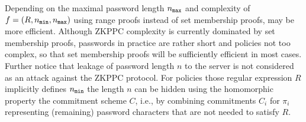 \begin{remark}\label{rangeproofs}
Depending on the maximal password length ${n_\mathtt{max}}$ and complexity of $f=(R,{n_\mathtt{min}},{n_\mathtt{max}})$ using range proofs instead of set membership proofs, may be more efficient.
Although ZKPPC complexity is currently dominated by set membership proofs, passwords in practice are rather short and policies not too complex, so that set membership proofs will be sufficiently efficient in most cases.
Further notice that leakage of password length $n$ to the server is not considered as an attack against the ZKPPC protocol. 
For policies those regular expression $R$ implicitly defines ${n_\mathtt{min}}$ the length $n$ can be hidden using the homomorphic property the commitment scheme $C$, i.e., by combining commitments $C_i$ for $\pi_i$ representing (remaining) password characters that are not needed to satisfy $R$.
\end{remark}


